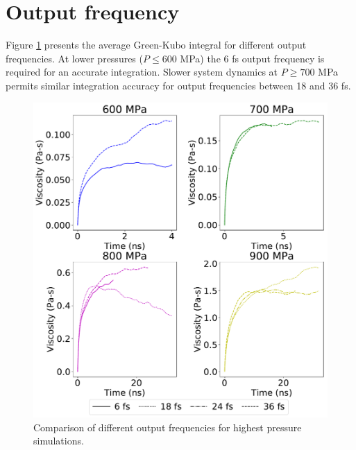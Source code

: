 \documentclass[preprint,review,11pt]{elsarticle}
\begin{document}
    \clearpage
    \newpage

    \section{Output frequency} \label{SI:Output frequency}
    
    Figure \ref{fig:compare_output_frequency} presents the average Green-Kubo integral for different output frequencies. At lower pressures ($P \le 600$ MPa) the 6 fs output frequency is required for an accurate integration. Slower system dynamics at $P \ge 700$ MPa permits similar integration accuracy for output frequencies between 18 and 36 fs.	
    
    \begin{figure}[htb!]
    	\centering
    	\includegraphics[width=6.4in]{output_freq_all.pdf}
    	\caption{Comparison of different output frequencies for highest pressure simulations.}
    	\label{fig:compare_output_frequency}
    \end{figure}

		
%		
%	
%	
%	
	
\end{document}
